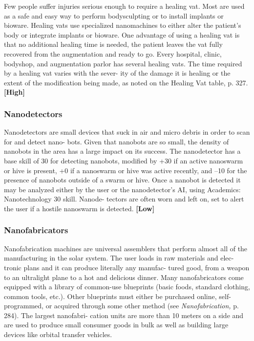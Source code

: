 Few people suffer injuries serious enough to require 
a healing vat. Most are used as a safe and easy way 
to perform bodysculpting or to install implants or 
bioware. Healing vats use specialized nanomachines 
to either alter the patient's body or integrate implants 
or bioware. One advantage of using a healing vat is 
that no additional healing time is needed, the patient 
leaves the vat fully recovered from the augmentation 
and ready to go. Every hospital, clinic, bodyshop, and 
augmentation parlor has several healing vats. The 
time required by a healing vat varies with the sever-
ity of the damage it is healing or the extent of the 
modification being made, as noted on the Healing Vat 
table, p. 327. \textbf{[High]}

\subsubsection{Nanodetectors}

Nanodetectors are small devices that suck in air and 
micro debris in order to scan for and detect nano-
bots. Given that nanobots are so small, the density of 
nanobots in the area has a large impact on its success. 
The nanodetector has a base skill of 30 for detecting 
nanobots, modified by +30 if an active nanoswarm or 
hive is present, +0 if a nanoswarm or hive was active 
recently, and –10 for the presence of nanobots outside 
of a swarm or hive. Once a nanobot is detected it may 
be analyzed either by the user or the nanodetector's AI, 
using Academics: Nanotechnology 30 skill. Nanode-
tectors are often worn and left on, set to alert the user 
if a hostile nanoswarm is detected. \textbf{[Low]}

\subsubsection{Nanofabricators}

Nanofabrication machines are universal assemblers 
that perform almost all of the manufacturing in the 
solar system. The user loads in raw materials and elec-
tronic plans and it can produce literally any manufac-
tured good, from a weapon to an ultralight plane to a 
hot and delicious dinner. Many nanofabricators come 
equipped with a library of common-use blueprints 
(basic foods, standard clothing, common tools, etc.). 
Other blueprints must either be purchased online, self-
programmed, or acquired through some other method 
(see \textit{Nanofabrication,} p. 284). The largest nanofabri-
cation units are more than 10 meters on a side and are 
used to produce small consumer goods in bulk as well 
as building large devices like orbital transfer vehicles.

